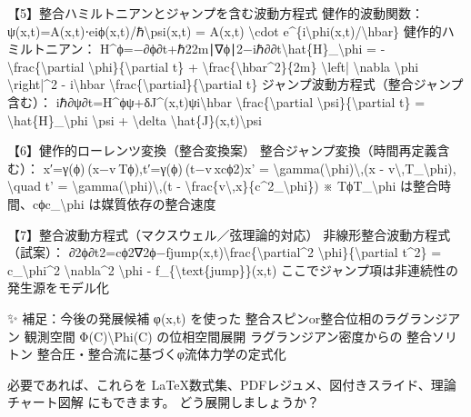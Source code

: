 \documentclass{article}
\begin{document}
【5】整合ハミルトニアンとジャンプを含む波動方程式
健作的波動関数：
ψ(x,t)=A(x,t)⋅eiϕ(x,t)/ℏ\textbackslash{}psi(x,t) = A(x,t) \textbackslash{}cdot e\textasciicircum{}\{i\textbackslash{}phi(x,t)/\textbackslash{}hbar\} 
健作的ハミルトニアン：
H\textasciicircum{}ϕ=−∂ϕ∂t+ℏ22m∣∇ϕ∣2−iℏ∂∂t\textbackslash{}hat\{H\}\_\textbackslash{}phi = - \textbackslash{}frac\{\textbackslash{}partial \textbackslash{}phi\}\{\textbackslash{}partial t\} + \textbackslash{}frac\{\textbackslash{}hbar\textasciicircum{}2\}\{2m\} \textbackslash{}left| \textbackslash{}nabla \textbackslash{}phi \textbackslash{}right|\textasciicircum{}2 - i\textbackslash{}hbar \textbackslash{}frac\{\textbackslash{}partial\}\{\textbackslash{}partial t\} 
ジャンプ波動方程式（整合ジャンプ含む）：
iℏ∂ψ∂t=H\textasciicircum{}ϕψ+δJ\textasciicircum{}(x,t)ψi\textbackslash{}hbar \textbackslash{}frac\{\textbackslash{}partial \textbackslash{}psi\}\{\textbackslash{}partial t\} = \textbackslash{}hat\{H\}\_\textbackslash{}phi \textbackslash{}psi + \textbackslash{}delta \textbackslash{}hat\{J\}(x,t)\textbackslash{}psi 

【6】健作的ローレンツ変換（整合変換案）
整合ジャンプ変換（時間再定義含む）：
x′=γ(ϕ) (x−v Tϕ),t′=γ(ϕ) (t−v xcϕ2)x' = \textbackslash{}gamma(\textbackslash{}phi)\textbackslash{},(x - v\textbackslash{},T\_\textbackslash{}phi), \textbackslash{}quad t' = \textbackslash{}gamma(\textbackslash{}phi)\textbackslash{},(t - \textbackslash{}frac\{v\textbackslash{},x\}\{c\textasciicircum{}2\_\textbackslash{}phi\}) 
※ TϕT\_\textbackslash{}phi は整合時間、cϕc\_\textbackslash{}phi は媒質依存の整合速度

【7】整合波動方程式（マクスウェル／弦理論的対応）
非線形整合波動方程式（試案）：
∂2ϕ∂t2=cϕ2∇2ϕ−fjump(x,t)\textbackslash{}frac\{\textbackslash{}partial\textasciicircum{}2 \textbackslash{}phi\}\{\textbackslash{}partial t\textasciicircum{}2\} = c\_\textbackslash{}phi\textasciicircum{}2 \textbackslash{}nabla\textasciicircum{}2 \textbackslash{}phi - f\_\{\textbackslash{}text\{jump\}\}(x,t) 
ここでジャンプ項は非連続性の発生源をモデル化

✨ 補足：今後の発展候補
φ(x,t) を使った 整合スピンor整合位相のラグランジアン
観測空間 Φ(C)\textbackslash{}Phi(C) の位相空間展開
ラグランジアン密度からの 整合ソリトン
整合圧・整合流に基づくφ流体力学の定式化

必要であれば、これらを LaTeX数式集、PDFレジュメ、図付きスライド、理論チャート図解 にもできます。
どう展開しましょうか？
\end{document}
